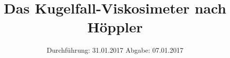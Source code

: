 


\subject{V207}
\title{Das Kugelfall-Viskosimeter nach Höppler}
\date{
	Durchführung: 31.01.2017
	\hspace{4em}
	Abgabe: 07.01.2017
}


	\maketitle
	\newpage
	\tableofcontents
	\newpage
	
	
	
	
	
	
	\newpage
	
	\printbibliography

